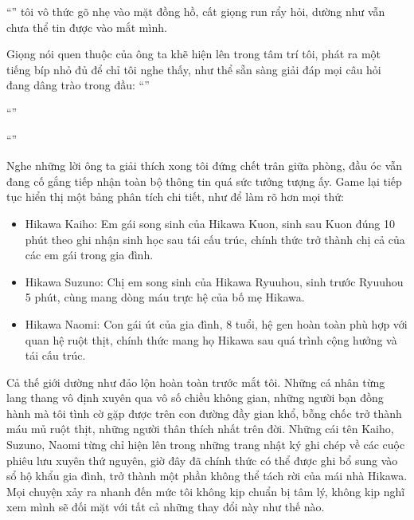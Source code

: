 ﻿\documentclass[../main.tex]{subfiles}
\begin{document}
``'' tôi vô thức gõ nhẹ vào mặt đồng hồ, cất giọng run rẩy hỏi, dường như vẫn chưa thể tin được vào mắt mình.

Giọng nói quen thuộc của ông ta khẽ hiện lên trong tâm trí tôi, phát ra một tiếng bíp nhỏ đủ để chỉ tôi nghe thấy, như thể sẵn sàng giải đáp mọi câu hỏi đang dâng trào trong đầu: ``''

``''

``''

Nghe những lời ông ta giải thích xong tôi đứng chết trân giữa phòng, đầu óc vẫn đang cố gắng tiếp nhận toàn bộ thông tin quá sức tưởng tượng ấy. Game lại tiếp tục hiển thị một bảng phân tích chi tiết, như để làm rõ hơn mọi thứ:

\begin{itemize}
    \item Hikawa Kaiho: Em gái song sinh của Hikawa Kuon, sinh sau Kuon đúng 10 phút theo ghi nhận sinh học sau tái cấu trúc, chính thức trở thành chị cả của các em gái trong gia đình.
    \item Hikawa Suzuno: Chị em song sinh của Hikawa Ryuuhou, sinh trước Ryuuhou 5 phút, cùng mang dòng máu trực hệ của bố mẹ Hikawa.
    \item Hikawa Naomi: Con gái út của gia đình, 8 tuổi, hệ gen hoàn toàn phù hợp với quan hệ ruột thịt, chính thức mang họ Hikawa sau quá trình cộng hưởng và tái cấu trúc.
\end{itemize}

Cả thế giới dường như đảo lộn hoàn toàn trước mắt tôi. Những cá nhân từng lang thang vô định xuyên qua vô số chiều không gian, những người bạn đồng hành mà tôi tình cờ gặp được trên con đường đầy gian khổ, bỗng chốc trở thành máu mủ ruột thịt, những người thân thích nhất trên đời. Những cái tên Kaiho, Suzuno, Naomi từng chỉ hiện lên trong những trang nhật ký ghi chép về các cuộc phiêu lưu xuyên thứ nguyên, giờ đây đã chính thức có thể được ghi bổ sung vào sổ hộ khẩu gia đình, trở thành một phần không thể tách rời của mái nhà Hikawa. Mọi chuyện xảy ra nhanh đến mức tôi không kịp chuẩn bị tâm lý, không kịp nghĩ xem mình sẽ đối mặt với tất cả những thay đổi này như thế nào.
\end{document}
